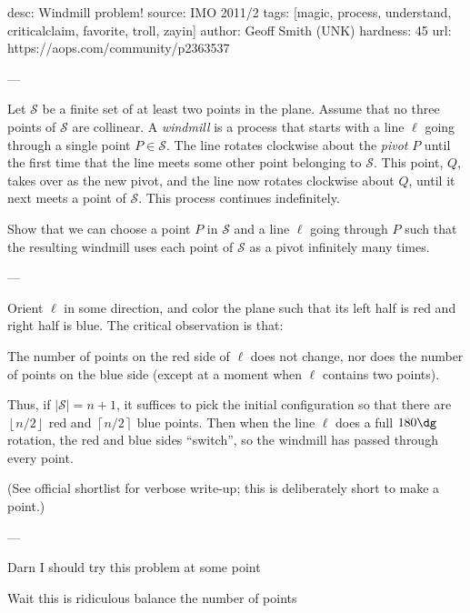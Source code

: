 desc:  Windmill problem!
source:  IMO 2011/2
tags:  [magic, process, understand, criticalclaim, favorite, troll, zayin]
author: Geoff Smith (UNK)
hardness: 45
url: https://aops.com/community/p2363537

---

Let $\mathcal{S}$ be a finite set of at least two points in the plane.
Assume that no three points of $\mathcal S$ are collinear.
A \emph{windmill} is a process that starts with a
line $\ell$ going through a single point $P \in \mathcal S$.
The line rotates clockwise about the \emph{pivot} $P$ until the first time
that the line meets some other point belonging to $\mathcal S$.
This point, $Q$, takes over as the new pivot,
and the line now rotates clockwise about $Q$,
until it next meets a point of $\mathcal S$.
This process continues indefinitely.

Show that we can choose a point $P$ in $\mathcal S$ and
a line $\ell$ going through $P$ such that the resulting windmill
uses each point of $\mathcal S$ as a pivot infinitely many times.

---

Orient $\ell$ in some direction,
and color the plane such that its left half is red
and right half is blue.
The critical observation is that:
\begin{claim*}
  The number of points on the red side of $\ell$ does not change,
  nor does the number of points on the blue side
  (except at a moment when $\ell$ contains two points).
\end{claim*}

Thus, if $|\mathcal S| = n+1$,
it suffices to pick the initial configuration
so that there are $\left\lfloor n/2 \right\rfloor$
red and $\left\lceil n/2 \right\rceil$ blue points.
Then when the line $\ell$ does a full $180\dg$ rotation,
the red and blue sides ``switch'',
so the windmill has passed through every point.

(See official shortlist for verbose write-up;
this is deliberately short to make a point.)


---

Darn I should try this problem at some point

Wait this is ridiculous balance the number of points
